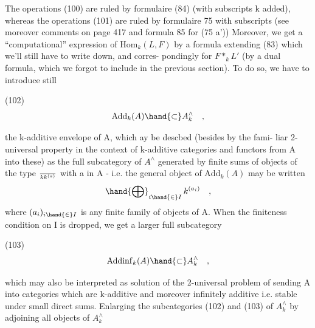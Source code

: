 The operations (100) are ruled by formulaire (84) (with subscripts k
added), whereas the operations (101) are ruled by formulaire 75 with
subscripts (see moreover  comments on page 417\hand{,} and formula 85 for (75 a'))\unsure{\hand{,}}
 Moreover, we get a ``computational'' expression of $\mathrm{Hom}_{k}(L,F)$ by 
a formula extending (83) which we'll still have to write down, and corres-%
pondingly for $F *_{k}L'$ (by a dual formula, which we forgot to include in
the previous section). To do so, we have to introduce still

(102) \[ \mathrm{Add}_{k}(A)\hand{\subset} A^{\wedge}_{k} \quad , \]

the k-additive envelope of A, which ay be descbed (besides by the fami-%
liar 2-universal property in the context of k-additive categories and
functors from A into these) as the full subcategory of $A^{\wedge}$ generated by
finite sums of objects of the type $\over{k}{k}^{(a)}$ with a in A - i.e. the general
object of $\mathrm{Add}_{k}(A)$ may be written
\[ \hand{\bigoplus}_{i\hand{\in} I}\, k^{(a_{i})} \quad , \]
where $(a_{i})_{i\hand{\in} I}$ is any finite family of objects of A. When the finiteness
condition on I is dropped, we get a larger full subcategory

(103) \[ \mathrm{Addinf}_{k}(A)\hand{\subset} A^{\wedge}_{k} \quad , \]

which may also be interpreted as  solution of the 2-universal problem
of sending A into categories which are k-additive and moreover infinitely
additive i.e. stable under small direct sums.  Enlarging the 
subcategories (102) and (103) of $A^{\wedge}_{k}$ by adjoining all objects of $A^{\wedge}_{k}$

